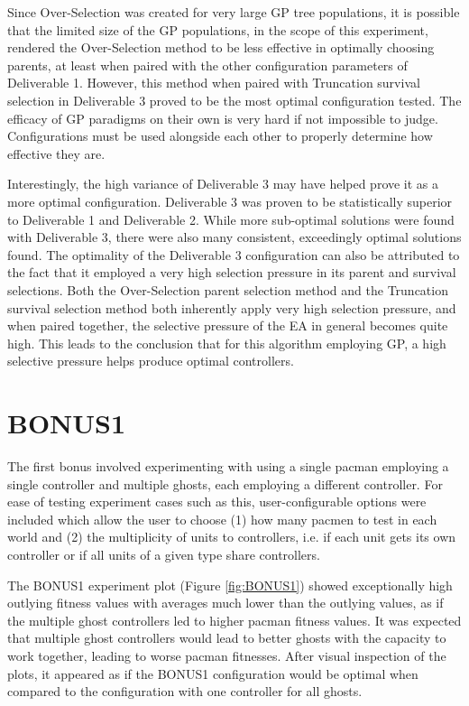 \documentclass[11pt]{article}
\begin{document}
Since Over-Selection was created for very large GP tree populations, it is possible that the limited size
of the GP populations, in the scope of this experiment, rendered the Over-Selection method to 
be less effective in optimally choosing parents, at least when paired with the
other configuration parameters of Deliverable 1. However, this method when paired with Truncation survival
selection in Deliverable 3 proved to be the most optimal configuration tested. The efficacy of GP paradigms 
on their own is very hard if not impossible to judge. Configurations must be used alongside each other to properly 
determine how effective they are.

Interestingly, the high variance of Deliverable 3 may have helped prove it as a more optimal configuration. Deliverable 3 was 
proven to be statistically superior to Deliverable 1 and Deliverable 2. While more sub-optimal solutions were found with Deliverable 3,
there were also many consistent, exceedingly optimal solutions found. The optimality of the Deliverable 3 
configuration can also be attributed to the fact that it employed a very high selection pressure in its parent and survival selections. Both
the Over-Selection parent selection method and the Truncation survival selection method both inherently apply very high selection
pressure, and when paired together, the selective pressure of the EA in general becomes quite high. This leads to the conclusion
that for this algorithm employing GP, a high selective pressure helps produce optimal controllers.


\section{BONUS1}
The first bonus involved experimenting with using a single pacman employing a single controller and multiple ghosts, 
each employing a different controller.
For ease of testing experiment cases such as this, user-configurable options were included which allow the user to choose
(1) how many pacmen to test in each world and (2) the multiplicity of units to controllers, i.e. if each unit gets its own 
controller or if all units of a given type share controllers.

The BONUS1 experiment plot (Figure \ref{fig:BONUS1}) showed exceptionally high outlying fitness values with averages much
lower than the outlying values, as if the multiple ghost controllers led to higher pacman fitness values. It was
expected that multiple ghost controllers would lead to better ghosts with the capacity to work together, leading
to worse pacman fitnesses.
After visual inspection of the plots, it appeared as if the BONUS1 configuration would be 
optimal when compared to the configuration with one controller for all ghosts.
\end{document}
